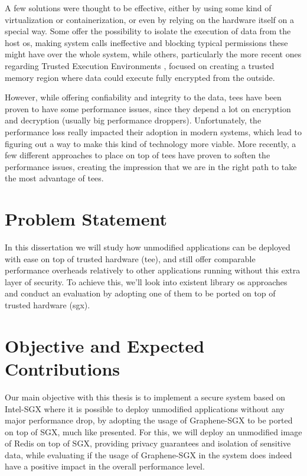 A few solutions were thought to be effective, either by using some kind of virtualization or containerization, or even by relying on the hardware itself on a special way. 
Some \cite{virtGhostPaper}\cite{flickerPaper}\cite{mushiPaper}\cite{SeCagePaper}\cite{inkTagPaper}\cite{segoPaper} offer the possibility to isolate the execution of data from the host \gls{os}, making system calls ineffective and blocking typical permissions these might have over the whole system, while others, particularly the more recent ones regarding Trusted Execution Environments \cite{armTZPaper}\cite{amdPaper}\cite{sanctumPaper}\cite{intelSGX}, focused on creating a trusted memory region where data could execute fully encrypted from the outside. 

However, while offering confiability and integrity to the data, \gls{tee}s have been proven to have some performance issues, since they depend a lot on encryption and decryption (usually big performance droppers). Unfortunately, the performance loss really impacted their adoption in modern systems, which lead to figuring out a way to make this kind of technology more viable. 
More recently, a few different approaches to place on top of \gls{tee}s have proven to soften the performance issues, creating the impression that we are in the right path to take the most advantage of \gls{tee}s. 


\section{Problem Statement}

In this dissertation we will study how unmodified applications can be deployed with ease on top of trusted hardware (\gls{tee}), and still offer comparable performance overheads relatively to other applications running without this extra layer of security. To achieve this, we'll look into existent library \gls{os} approaches and conduct an evaluation by adopting one of them to be ported on top of trusted hardware (\gls{sgx}). 




\section{Objective and Expected Contributions} %
\label{sec:disclaimer}
Our main objective with this thesis is to implement a secure system based on Intel-SGX
where it is possible to deploy unmodified applications without any major performance
drop, by adopting the usage of Graphene-SGX to be ported on top of SGX, much like \cite{graphenePaper} presented. For this, we will deploy an unmodified image of Redis \cite{redis} on top of SGX, providing privacy guarantees and isolation of sensitive data, while evaluating if the usage of Graphene-SGX in the system does indeed have a positive impact in the overall performance level.


